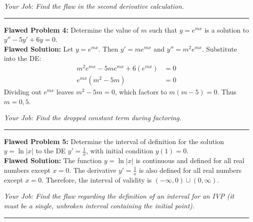 \documentclass[12pt]{article}
\begin{document}
\vspace{0.2cm}
\textit{Your Job: Find the flaw in the second derivative calculation.}
\vspace{0.3cm}
\hrule

\vspace{0.3cm}
\textbf{Flawed Problem 4:} Determine the value of $m$ such that $y = e^{mx}$ is a solution to $y'' - 5y' + 6y = 0$.
\\
\textbf{Flawed Solution:}
Let $y = e^{mx}$. Then $y' = m e^{mx}$ and $y'' = m^2 e^{mx}$. 
Substitute into the DE:
\begin{align*}
    m^2 e^{mx} - 5m e^{mx} + 6(e^{mx}) &= 0 \\
    e^{mx}(m^2 - 5m) &= 0
\end{align*}
Dividing out $e^{mx}$ leaves $m^2 - 5m = 0$, which factors to $m(m-5)=0$. Thus $m=0, 5$.

\vspace{0.2cm}
\textit{Your Job: Find the dropped constant term during factoring.}
\vspace{0.3cm}
\hrule

\vspace{0.3cm}
\textbf{Flawed Problem 5:} Determine the interval of definition for the solution $y = \ln|x|$ to the DE $y' = \frac{1}{x}$, with initial condition $y(1) = 0$.
\\
\textbf{Flawed Solution:}
The function $y = \ln|x|$ is continuous and defined for all real numbers except $x=0$. The derivative $y' = \frac{1}{x}$ is also defined for all real numbers except $x=0$. Therefore, the interval of validity is $(-\infty, 0) \cup (0, \infty)$.

\vspace{0.2cm}
\textit{Your Job: Find the flaw regarding the definition of an interval for an IVP (it must be a single, unbroken interval containing the initial point).}
\vspace{0.3cm}
\hrule
\end{document}
